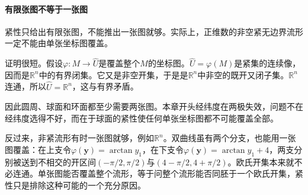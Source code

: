 \paragraph{有限张图不等于一张图}
紧性只给出有限张图，不能推出一张图就够。实际上，正维数的非空紧无边界流形一定不能由单张坐标图覆盖。

证明很短。假设$\varphi:M\to\widehat U$是覆盖整个$M$的坐标图。$\widehat U=\varphi(M)$是紧集的连续像，因而是$\mathbb R^n$中的有界闭集。它又是非空开集，于是是$\mathbb R^n$中非空的既开又闭子集。$\mathbb R^n$连通，所以$\widehat U=\mathbb R^n$，这与有界矛盾。

因此圆周、球面和环面都至少需要两张图。本章开头经纬度在两极失效，问题不在经纬度选得不好，而在于球面的紧性使任何单张坐标图都不可能覆盖全部。

反过来，非紧流形有时一张图就够，例如$\mathbb R^n$。双曲线虽有两个分支，也能用一张图覆盖：在上支令$\varphi(\bm y)=\arctan y_1$，在下支令$\varphi(\bm y)=\arctan y_1+4$，两支分别被送到不相交的开区间$(-\pi/2,\pi/2)$与$(4-\pi/2,4+\pi/2)$。欧氏开集本来就不必连通。单张图能否覆盖整个流形，等于问整个流形能否同胚于一个欧氏开集，紧性只是排除这种可能的一个充分原因。
